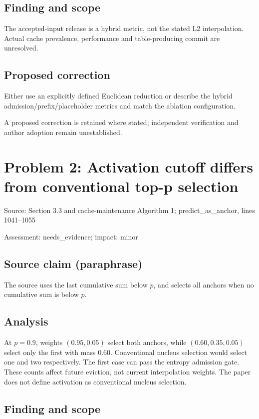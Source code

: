 \documentclass[11pt]{article}
\begin{document}
\subsection*{Finding and scope}

The accepted-input release is a hybrid metric, not the stated L2 interpolation. Actual cache prevalence, performance and table-producing commit are unresolved.

\subsection*{Proposed correction}

Either use an explicitly defined Euclidean reduction or describe the hybrid admission/prefix/placeholder metrics and match the ablation configuration.

A proposed correction is retained where stated; independent verification and author adoption remain unestablished.

\section*{Problem 2: Activation cutoff differs from conventional top-p selection}

Source: Section 3.3 and cache-maintenance Algorithm 1; predict\_as\_anchor, lines 1041–1055

Assessment: needs\_evidence; impact: minor

\subsection*{Source claim (paraphrase)}

The source uses the last cumulative sum below \(p\), and selects all anchors when no cumulative sum is below \(p\).

\subsection*{Analysis}

At \(p=0.9\), weights \((0.95,0.05)\) select both anchors, while \((0.60,0.35,0.05)\) select only the first with mass \(0.60\). Conventional nucleus selection would select one and two respectively. The first case can pass the entropy admission gate. These counts affect future eviction, not current interpolation weights. The paper does not define activation as conventional nucleus selection.

\subsection*{Finding and scope}
\end{document}

